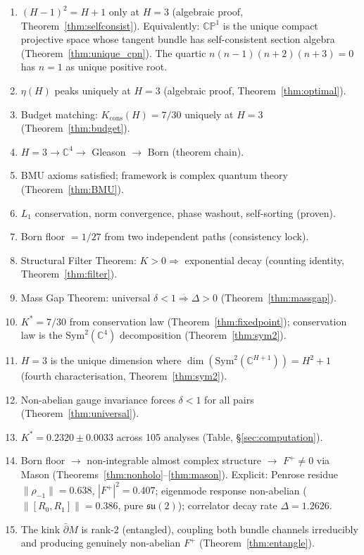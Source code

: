 \documentclass[11pt,a4paper]{article}
\theoremstyle{definition}
\theoremstyle{remark}
\newcommand{\CP}{\mathbb{CP}}
\newcommand{\C}{\mathbb{C}}
\newcommand{\dbar}{\bar{\partial}}
\newcommand{\su}{\mathfrak{su}}
\begin{document}
\begin{enumerate}[nosep]
\item $(H-1)^2=H+1$ only at $H=3$ (algebraic proof, Theorem~\ref{thm:selfconsist}). Equivalently: $\CP^1$ is the unique compact projective space whose tangent bundle has self-consistent section algebra (Theorem~\ref{thm:unique_cpn}). The quartic $n(n-1)(n+2)(n+3)=0$ has $n=1$ as unique positive root.
\item $\eta(H)$ peaks uniquely at $H=3$ (algebraic proof, Theorem~\ref{thm:optimal}).
\item Budget matching: $K_{\mathrm{cons}}(H)=7/30$ uniquely at $H=3$ (Theorem~\ref{thm:budget}).
\item $H=3\to\C^4\to$ Gleason $\to$ Born (theorem chain).
\item BMU axioms satisfied; framework is complex quantum theory (Theorem~\ref{thm:BMU}).
\item $L_1$ conservation, norm convergence, phase washout, self-sorting (proven).
\item Born floor $=1/27$ from two independent paths (consistency lock).
\item Structural Filter Theorem: $K>0\Rightarrow$ exponential decay (counting identity, Theorem~\ref{thm:filter}).
\item Mass Gap Theorem: universal $\delta<1\Rightarrow\Delta>0$ (Theorem~\ref{thm:massgap}).
\item $K^*=7/30$ from conservation law (Theorem~\ref{thm:fixedpoint}); conservation law is the $\mathrm{Sym}^2(\C^4)$ decomposition (Theorem~\ref{thm:sym2}).
\item $H=3$ is the unique dimension where $\dim(\mathrm{Sym}^2(\C^{H+1}))=H^2+1$ (fourth characterisation, Theorem~\ref{thm:sym2}).
\item Non-abelian gauge invariance forces $\delta<1$ for all pairs (Theorem~\ref{thm:universal}).
\item $K^*=0.2320\pm 0.0033$ across 105 analyses (Table, \S\ref{sec:computation}).
\item Born floor $\to$ non-integrable almost complex structure $\to$ $F^+\neq 0$ via Mason (Theorems~\ref{thm:nonholo}--\ref{thm:mason}). Explicit: Penrose residue $\|\rho_{-1}\|=0.638$, $|F^+|^2=0.407$; eigenmode response non-abelian ($\|[R_0,R_1]\|=0.386$, pure $\su(2)$); correlator decay rate $\Delta=1.2626$.
\item The kink $\dbar M$ is rank-2 (entangled), coupling both bundle channels irreducibly and producing genuinely non-abelian $F^+$ (Theorem~\ref{thm:entangle}).

\end{enumerate}
\end{document}
